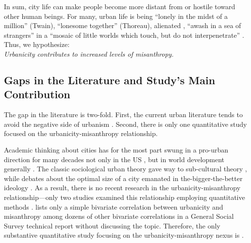 \documentclass[11pt, letterpaper]{article}
\begin{document}
\begin{spacing}{1.4}
In sum, city life can make people become more distant from or hostile toward other human beings. %
For many, urban life is being ``lonely in the midst of a million'' (Twain), ``lonesome together''
(Thoreau), alienated \citep{wirth38,nettler1957measure}, ``awash in a sea of strangers''
\citep[Merry cited in][p. 99]{wilson85} in a ``mosaic of little worlds which touch, but do not interpenetrate'' \citep[][p. 40]{park84}. Thus, we hypothesize: \\
 
{\indent\hspace{1in}\textit{Urbanicity contributes to increased levels of misanthropy.\\}}
     

\subsection*{Gaps in the Literature and Study's Main Contribution} 

The gap in the literature is two-fold. First, the current urban literature tends to avoid the negative side of  urbanism \citep{thrift05,amin06,aokCityBook15,peck16}. Second, there is only one quantitative study  focused on the urbanicity-misanthropy relationship. 

Academic thinking about cities has for the most part swung in a pro-urban direction for many decades not only in the US \citep{hansonCityJournalautumn15}, but in world development generally \citep{lipton77}. The classic sociological urban theory \citep{wirth38,milgram70,park15,park84,simmel03,tonnies57} gave way to
  sub-cultural theory \citep{fischer75,fischer95,wilson85, palisi83}, while debates about the optimal size of a city \citep{richardson72,singell74,alonso60,alonso71,elgin75,capello00} emanated in the-bigger-the-better ideology \citep{glaeser11}. As a result, there is no recent research in the urbanicity-misanthropy relationship---only two studies examined this relationship employing quantitative methods \citep{wilson85,smith97}. \citet{smith97} lists only a simple bivariate correlation between urbanicity and misanthropy among dozens of other bivariate correlations in a General Social Survey technical report without discussing the topic. 
Therefore, the only substantive quantitative study focusing on the urbanicity-misanthropy nexus is \citet{wilson85}.%



\end{spacing}
\end{document}
